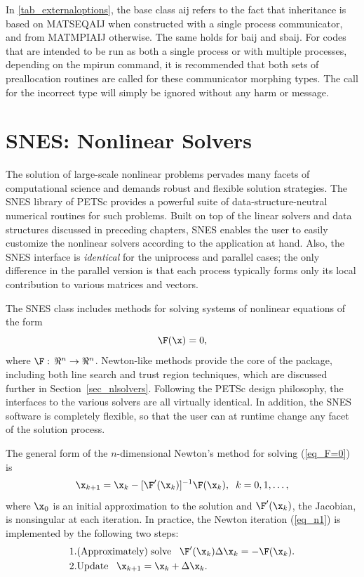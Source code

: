 In \ref{tab_externaloptions}, the base class aij refers to the fact
that inheritance is based on MATSEQAIJ when constructed with a single
process communicator, and from MATMPIAIJ otherwise.  The same holds
for baij and sbaij.  For codes that are intended to be run as both a
single process or with multiple processes, depending on the mpirun
command, it is recommended that both sets of preallocation routines
are called for these communicator morphing types.  The call for the
incorrect type will simply be ignored without any harm or message.


\chapter{SNES: Nonlinear Solvers}
\label{chapter_snes}

The solution of large-scale nonlinear problems pervades many facets of
computational science and demands robust and flexible solution
strategies. The SNES library of PETSc provides a powerful suite of
data-structure-neutral numerical routines for such problems.  Built on
top of the linear solvers and data structures discussed in preceding
chapters, SNES enables the user to easily customize the nonlinear
solvers according to the application at hand.  Also, the SNES
interface is {\em identical} for the uniprocess and parallel cases;
the only difference in the parallel version is that each process
typically forms only its local contribution to various matrices and
vectors.

The SNES class includes methods for solving systems of nonlinear equations of the form 
\begin{equation}
\F(\x) = 0,
\label{eq_F=0}
\end{equation}
where $\F: \, \Re^n \rightarrow \Re^n$.
Newton-like methods provide the core of the package, including
 both line search  
and trust region  techniques, which are discussed
further in Section~\ref{sec_nlsolvers}. Following the
PETSc design philosophy, the interfaces to the various solvers are all
virtually identical. In addition, the SNES software is completely
flexible, so that the user can at runtime change any facet of the
solution process.

The general form of the $n$-dimensional Newton's method for solving
(\ref{eq_F=0}) is
\begin{equation}
     \x_{k+1} = \x_k - [ \F'(\x_k)]^{-1} \F(\x_k), \;\; k=0,1, \ldots, 
\label{eq_n1}
\end{equation}
where $ \x_0 $ is an initial approximation to the solution and   
$ \F'(\x_k) $, the Jacobian, is nonsingular at each iteration.  
In practice, the Newton iteration (\ref{eq_n1}) is implemented by
the following two steps:
\begin{eqnarray}
  1. & {\rm (Approximately) \;solve\;\;\;} \F'(\x_k) \Delta \x_k = -\F(\x_k).\\
  2. & {\rm Update\;\;\;} \x_{k+1} = \x_k + \Delta \x_k. \hspace{.225in}
\end{eqnarray}


